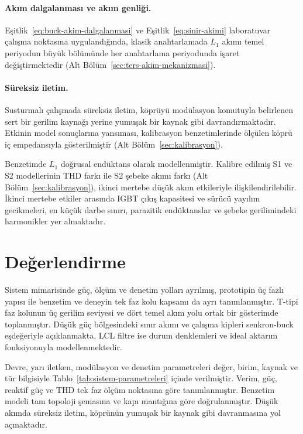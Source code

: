 \paragraph{Akım dalgalanması ve akım genliği.} Eşitlik~\eqref{eq:buck-akim-dalgalanmasi} ve Eşitlik~\eqref{eq:sinir-akimi} laboratuvar çalışma noktasına uygulandığında, klasik anahtarlamada $L_1$ akımı temel periyodun büyük bölümünde her anahtarlama periyodunda işaret değiştirmektedir (Alt Bölüm~\ref{sec:ters-akim-mekanizmasi}).

\paragraph{Süreksiz iletim.} Susturmalı çalışmada süreksiz iletim, köprüyü modülasyon komutuyla belirlenen sert bir gerilim kaynağı yerine yumuşak bir kaynak gibi davrandırmaktadır. Etkinin model sonuçlarına yansıması, kalibrasyon benzetimlerinde ölçülen köprü iç empedansıyla gösterilmiştir (Alt Bölüm~\ref{sec:kalibrasyon}).

Benzetimde $L_1$ doğrusal endüktans olarak modellenmiştir. Kalibre edilmiş S1 ve S2 modellerinin THD farkı ile S2 şebeke akımı farkı (Alt Bölüm~\ref{sec:kalibrasyon}), ikinci mertebe düşük akım etkileriyle ilişkilendirilebilir. İkinci mertebe etkiler arasında IGBT çıkış kapasitesi ve sürücü yayılım gecikmeleri, en küçük darbe sınırı, parazitik endüktanslar ve şebeke gerilimindeki harmonikler yer almaktadır.

\section{Değerlendirme}

Sistem mimarisinde güç, ölçüm ve denetim yolları ayrılmış, prototipin üç fazlı yapısı ile benzetim ve deneyin tek faz kolu kapsamı da ayrı tanımlanmıştır. T-tipi faz kolunun üç gerilim seviyesi ve dört temel akım yolu ortak bir gösterimde toplanmıştır. Düşük güç bölgesindeki sınır akımı ve çalışma kipleri senkron-buck eşdeğeriyle açıklanmakta, LCL filtre ise durum denklemleri ve ideal aktarım fonksiyonuyla modellenmektedir.

Devre, yarı iletken, modülasyon ve denetim parametreleri değer, birim, kaynak ve tür bilgisiyle Tablo~\ref{tab:sistem-parametreleri} içinde verilmiştir. Verim, güç, reaktif güç ve THD tek faz ölçüm noktasına göre tanımlanmıştır. Benzetim modeli tam topoloji şemasına ve kapı mantığına göre doğrulanmıştır. Düşük akımda süreksiz iletim, köprünün yumuşak bir kaynak gibi davranmasına yol açmaktadır.
